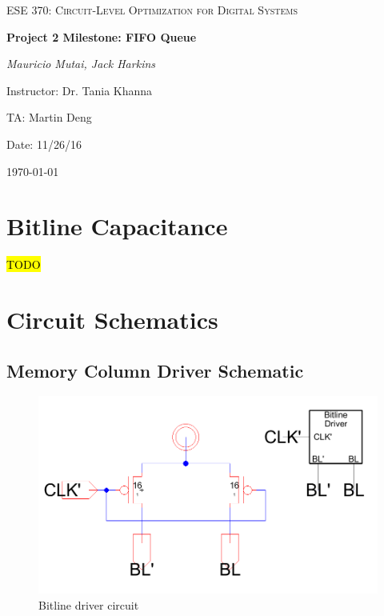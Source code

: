 \documentclass[12pt]{report}
\begin{document}
\begin{titlepage}
	\centering
	\vspace{1cm}
	{\scshape\Large ESE 370: Circuit-Level Optimization for Digital Systems\par}
	\vspace{1.5cm}
	{\huge\bfseries Project 2 Milestone: FIFO Queue\par}
	\vspace{2cm}
	{\Large\itshape Mauricio Mutai, Jack Harkins\par}
	\vfill
	Instructor: Dr. Tania Khanna\par
	TA: Martin Deng\par
	Date: 11/26/16

	\vfill

	{\large \today\par}
\end{titlepage}

\section*{Bitline Capacitance}
\hl{TODO}

\section*{Circuit Schematics}
\subsection*{Memory Column Driver Schematic}
\begin{figure}[H]
  \centering
    \includegraphics[width=1.0\textwidth]{bitline_driver_circuit.png}
  \caption{Bitline driver circuit}
  \label{fig:bitline_driver_circuit}
\end{figure}
\end{document}
